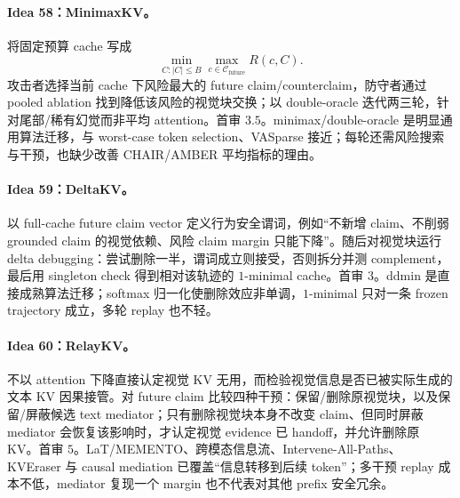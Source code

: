 \documentclass[UTF8,zihao=-4,a4paper]{ctexart}
\begin{document}
\paragraph{Idea 58：MinimaxKV。}
将固定预算 cache 写成
\[
\min_{C:|C|\le B}\max_{c\in\mathcal C_{\mathrm{future}}}R(c,C).
\]
攻击者选择当前 cache 下风险最大的 future claim/counterclaim，防守者通过 pooled ablation 找到降低该风险的视觉块交换；以 double-oracle 迭代两三轮，针对尾部/稀有幻觉而非平均 attention。首审 $3.5$。minimax/double-oracle 是明显通用算法迁移，与 worst-case token selection、VASparse 接近；每轮还需风险搜索与干预，也缺少改善 CHAIR/AMBER 平均指标的理由。

\paragraph{Idea 59：DeltaKV。}
以 full-cache future claim vector 定义行为安全谓词，例如“不新增 claim、不削弱 grounded claim 的视觉依赖、风险 claim margin 只能下降”。随后对视觉块运行 delta debugging：尝试删除一半，谓词成立则接受，否则拆分并测 complement，最后用 singleton check 得到相对该轨迹的 $1$-minimal cache。首审 $3$。ddmin 是直接成熟算法迁移；softmax 归一化使删除效应非单调，$1$-minimal 只对一条 frozen trajectory 成立，多轮 replay 也不轻。

\paragraph{Idea 60：RelayKV。}
不以 attention 下降直接认定视觉 KV 无用，而检验视觉信息是否已被实际生成的文本 KV 因果接管。对 future claim 比较四种干预：保留/删除原视觉块，以及保留/屏蔽候选 text mediator；只有删除视觉块本身不改变 claim、但同时屏蔽 mediator 会恢复该影响时，才认定视觉 evidence 已 handoff，并允许删除原 KV。首审 $5$。LaT/MEMENTO、跨模态信息流、Intervene-All-Paths、KVEraser 与 causal mediation 已覆盖“信息转移到后续 token”；多干预 replay 成本不低，mediator 复现一个 margin 也不代表对其他 prefix 安全冗余。
\end{document}
